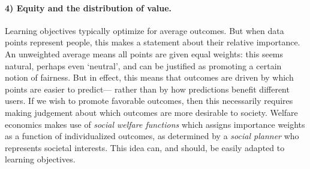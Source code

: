 {\paragraph{4) Equity and the distribution of value.}
Learning objectives typically optimize for average outcomes.
But when data points represent people,
this makes a statement about their relative importance.
An unweighted average means all points are given equal weights:
this seems natural, perhaps even `neutral',
and can be justified as promoting a certain notion of fairness.
But in effect, this means that outcomes are driven by which points are easier to predict---%
rather than by how  predictions benefit different users.
If we wish to promote favorable outcomes, then this necessarily requires making judgement about which outcomes are more desirable to society.
Welfare economics makes use of \emph{social welfare functions}
which assigns importance weights as a function of individualized outcomes, as
determined by a \emph{social planner} who represents societal interests.
This idea can, and should, be easily adapted to learning objectives.

}
\fi



